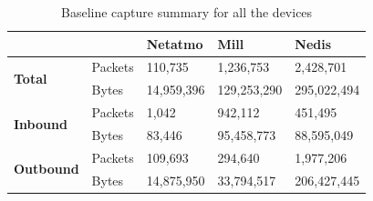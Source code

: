 \begin{table}[H]
    \centering
    \caption{Baseline capture summary for all the devices}
    \begin{tabular}{ll|l|l|l|}
    \cline{3-5}
                                                         &         & \textbf{Netatmo} & \textbf{Mill} & \textbf{Nedis} \\ \hline
        \multicolumn{1}{|l|}{\multirow{2}{*}{\textbf{Total}}}    & Packets & 110,735          & 1,236,753     & 2,428,701      \\ \cline{2-5} 
        \multicolumn{1}{|l|}{}                                   & Bytes   & 14,959,396       & 129,253,290   & 295,022,494    \\ \hline
        \multicolumn{1}{|l|}{\multirow{2}{*}{\textbf{Inbound}}}  & Packets & 1,042            & 942,112       & 451,495        \\ \cline{2-5} 
        \multicolumn{1}{|l|}{}                                   & Bytes   & 83,446           & 95,458,773    & 88,595,049     \\ \hline
        \multicolumn{1}{|l|}{\multirow{2}{*}{\textbf{Outbound}}} & Packets & 109,693          & 294,640       & 1,977,206      \\ \cline{2-5} 
        \multicolumn{1}{|l|}{}                                   & Bytes   & 14,875,950       & 33,794,517    & 206,427,445    \\ \hline
    \end{tabular}
    \label{tab:ComparingBaselineCalculations}
\end{table}
 
